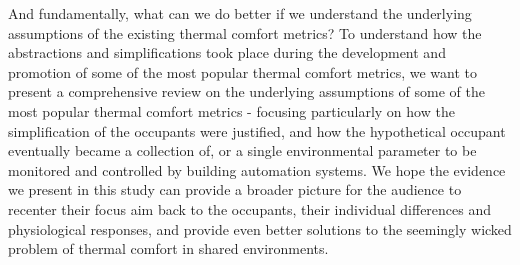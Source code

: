 And fundamentally, what can we do better if we understand the underlying assumptions of the existing thermal comfort metrics? To understand how the abstractions and simplifications took place during the development and promotion of some of the most popular thermal comfort metrics, we want to present a comprehensive review on the underlying assumptions of some of the most popular thermal comfort metrics - focusing particularly on how the simplification of the occupants were justified, and how the hypothetical occupant eventually became a collection of, or a single environmental parameter to be monitored and controlled by building automation systems. We hope the evidence we present in this study can provide a broader picture for the audience to recenter their focus aim back to the occupants, their individual differences and physiological responses, and provide even better solutions to the seemingly wicked problem of thermal comfort in shared environments.
